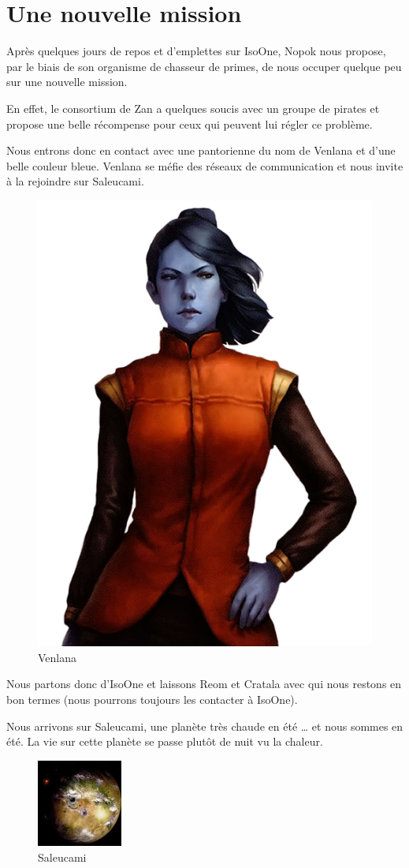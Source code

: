 \documentclass[a4paper,9pt,twoside,twocolumn,openany]{book}
\begin{document}
\section{Une nouvelle mission}
\subtitle{22 octobre 2017}

Après quelques jours de repos et d'emplettes sur IsoOne, Nopok nous propose, par le biais de son organisme de chasseur de primes, de nous occuper quelque peu sur une nouvelle mission.

En effet, le consortium de Zan a quelques soucis avec un groupe de pirates et propose une belle récompense pour ceux qui peuvent lui régler ce problème.

Nous entrons donc en contact avec une pantorienne du nom de Venlana et d’une belle couleur bleue. Venlana se méfie des réseaux de communication et nous invite à la rejoindre sur Saleucami.

\begin{figure}
    \includegraphics[width=0.5\columnwidth]{img/venlana.png}
    \caption{Venlana}
\end{figure}

Nous  partons donc d’IsoOne et laissons Reom et Cratala avec qui nous restons en bon termes (nous pourrons toujours les contacter à IsoOne).

Nous arrivons sur Saleucami, une planète très chaude en été … et nous sommes en été. La vie sur cette planète se passe plutôt de nuit vu la chaleur.

\begin{figure}
    \includegraphics[width=0.25\textwidth]{img/saleucami}
    \caption{Saleucami}
\end{figure}
\end{document}
